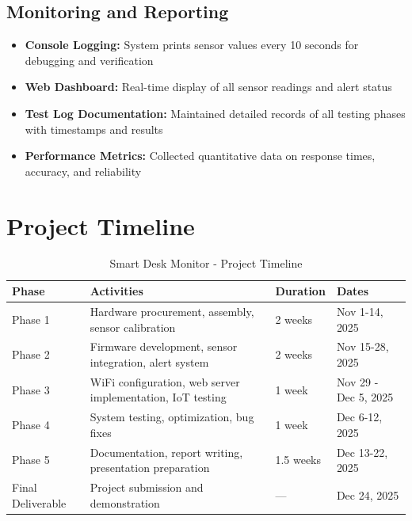 \documentclass[12pt,a4paper]{article}
\begin{document}
\subsection{Monitoring and Reporting}

\begin{itemize}
\item \textbf{Console Logging:} System prints sensor values every 10 seconds for debugging and verification

\item \textbf{Web Dashboard:} Real-time display of all sensor readings and alert status

\item \textbf{Test Log Documentation:} Maintained detailed records of all testing phases with timestamps and results

\item \textbf{Performance Metrics:} Collected quantitative data on response times, accuracy, and reliability
\end{itemize}

\section{Project Timeline}

\begin{table}[H]
\centering
\renewcommand{\arraystretch}{1.5}
\begin{tabularx}{\textwidth}{|X|X|X|X|}
\hline
\textbf{Phase} & \textbf{Activities} & \textbf{Duration} & \textbf{Dates} \\
\hline
Phase 1 & Hardware procurement, assembly, sensor calibration & 2 weeks & Nov 1-14, 2025 \\
\hline
Phase 2 & Firmware development, sensor integration, alert system & 2 weeks & Nov 15-28, 2025 \\
\hline
Phase 3 & WiFi configuration, web server implementation, IoT testing & 1 week & Nov 29 - Dec 5, 2025 \\
\hline
Phase 4 & System testing, optimization, bug fixes & 1 week & Dec 6-12, 2025 \\
\hline
Phase 5 & Documentation, report writing, presentation preparation & 1.5 weeks & Dec 13-22, 2025 \\
\hline
Final Deliverable & Project submission and demonstration & — & Dec 24, 2025 \\
\hline
\end{tabularx}
\caption{Smart Desk Monitor - Project Timeline}
\label{tab:timeline}
\end{table}
\end{document}
